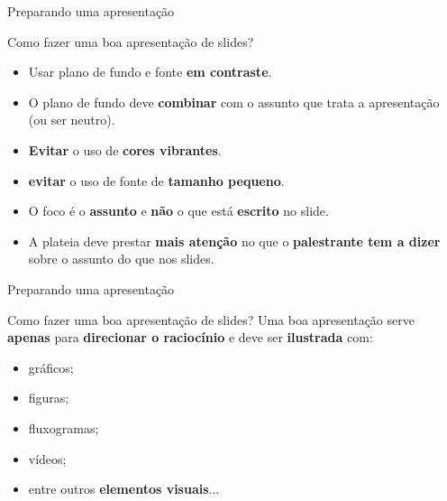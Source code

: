 \begin{frame}{Preparando uma apresentação}
	\begin{block}{Como fazer uma boa apresentação de slides?}
		\begin{itemize}
			\item Usar plano de fundo e fonte \textbf{em contraste}.
			\item O plano de fundo deve \textbf{combinar} com o assunto que trata a apresentação (ou ser neutro).
			\item \textbf{Evitar} o uso de \textbf{cores vibrantes}.
			\item \textbf{evitar} o uso de fonte de \textbf{tamanho pequeno}.
			\item O foco é o \textbf{assunto} e \textbf{não} o que está \textbf{escrito} no slide.
			\item A plateia deve prestar \textbf{mais atenção} no que o \textbf{palestrante tem a dizer} sobre o assunto do que nos slides.
		\end{itemize}
	\end{block}

\end{frame}



\begin{frame}{Preparando uma apresentação}
	\begin{block}{Como fazer uma boa apresentação de slides?}
		Uma boa apresentação serve \textbf{apenas} para \textbf{direcionar o raciocínio} e deve ser \textbf{ilustrada} com:
		\begin{itemize}
			\item gráficos;
			\item figuras;
			\item fluxogramas;
			\item vídeos;
			\item entre outros \textbf{elementos visuais}...
		\end{itemize}
	\end{block}

\end{frame}


